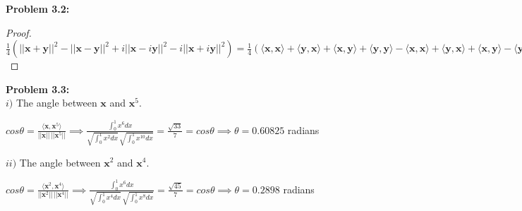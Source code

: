 \documentclass[letterpaper,12pt]{article}
\theoremstyle{definition}
\begin{document}
\noindent\textbf{Problem 3.2:}\\
\begin{proof}
$ \frac{1}{4}( ||\mathbf{x} + \mathbf{y}||^2 - ||\mathbf{x} - \mathbf{y}||^2 + i||\mathbf{x} - i\mathbf{y}||^2 - i||\mathbf{x} +i\mathbf{y}||^2) = \frac{1}{4}(\langle \mathbf{x}, \mathbf{x} \rangle    + \langle \mathbf{y}, \mathbf{x} \rangle    + \langle \mathbf{x}, \mathbf{y} \rangle    + \langle \mathbf{y}, \mathbf{y} \rangle    - \langle \mathbf{x}, \mathbf{x} \rangle    + \langle \mathbf{y}, \mathbf{x} \rangle    + \langle \mathbf{x}, \mathbf{y} \rangle    - \langle \mathbf{y}, \mathbf{y} \rangle    +\; i\langle \mathbf{x} - i\mathbf{y}, \mathbf{x} - i\mathbf{y} \rangle    - \;i \langle \mathbf{x} + i\mathbf{y}, \mathbf{x} + i\mathbf{y} \rangle   ) = \frac{1}{4}(2\langle \mathbf{x}, \mathbf{y} \rangle    + 2\langle \mathbf{y}, \mathbf{x} \rangle    +\; i\langle \mathbf{x}, \mathbf{x} \rangle    + \; i\langle -i\mathbf{y}, \mathbf{x} \rangle    + \langle \mathbf{x}, \mathbf{y} \rangle    + \langle -i\mathbf{y}, \mathbf{y} \rangle    -\;  i\langle \mathbf{x}, \mathbf{x} \rangle    - \; i\langle i\mathbf{y}, \mathbf{x} \rangle    + \langle \mathbf{x}, \mathbf{y} \rangle    + \langle i\mathbf{y}, \mathbf{y} \rangle   ) = \frac{1}{4}(2\langle \mathbf{x}, \mathbf{y} \rangle    + 2\langle \mathbf{y}, \mathbf{x} \rangle    + \;i\langle \mathbf{x}, \mathbf{x} \rangle    - \langle \mathbf{y}, \mathbf{x} \rangle    + \langle \mathbf{x}, \mathbf{y} \rangle    +\; i\langle \mathbf{y}, \mathbf{y} \rangle    -\; i\langle \mathbf{x}, \mathbf{x} \rangle    - \langle \mathbf{y}, \mathbf{x} \rangle     + \langle \mathbf{x}, \mathbf{y} \rangle    -\; i\langle \mathbf{y}, \mathbf{y} \rangle   ) = \frac{1}{4}(2\langle \mathbf{x}, \mathbf{y} \rangle    + 2\langle \mathbf{x}, \mathbf{y} \rangle   ) = \langle \mathbf{x}, \mathbf{y} \rangle   $
\end{proof}

\noindent\textbf{Problem 3.3:}\\
\noindent $i)$ The angle between $\mathbf{x}$ and $\mathbf{x}^5$. \begin{center} $cos\theta = \frac{\langle \mathbf{x}, \mathbf{x}^5 \rangle   }{||\mathbf{x}||\,||\mathbf{x}^5||} \implies \frac{\int^1_0 x^6 dx}{\sqrt{\int^1_0 x^2 dx}\, \sqrt{\int^1_0 x^{10} dx}}   = \frac{\sqrt{33}}{7} = cos\theta \implies \theta = 0.60825$ radians
\end{center}
\noindent $ii)$ The angle between $\mathbf{x}^2$ and $\mathbf{x}^4$. \begin{center} $cos\theta = \frac{\langle \mathbf{x}^2, \mathbf{x}^4 \rangle   }{||\mathbf{x}^2||\,||\mathbf{x}^4||} \implies \frac{\int^1_0 x^6 dx}{\sqrt{\int^1_0 x^4 dx}\, \sqrt{\int^1_0 x^{8} dx}}   = \frac{\sqrt{45}}{7} = cos\theta \implies \theta = 0.2898$ radians
\end{center}
\vspace{5mm}
\end{document}
